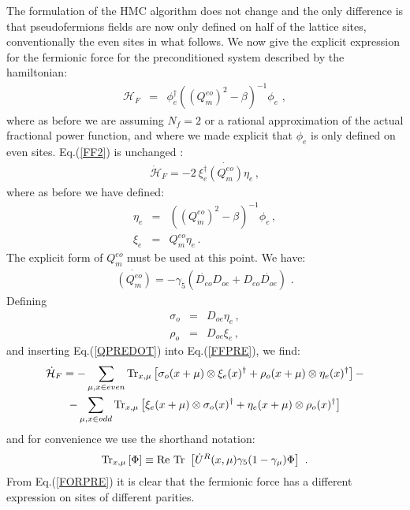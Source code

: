 \documentclass{article}[12pt]
\begin{document}
The formulation of the HMC algorithm does not change and the only difference is that pseudofermions fields
are now only defined on half of the lattice sites, conventionally the even sites in what follows.
We now give the explicit expression for the fermionic force for the preconditioned system described by
the hamiltonian:
\begin{eqnarray}
\mathcal{H}_F &=& \phi_e^\dagger ( (Q^{eo}_m)^2 - \beta )^{-1} \phi_e \,\, ,
\end{eqnarray}
where as before we are assuming $N_f=2$ or a rational approximation
of the actual fractional power function, and where we made explicit that $\phi_e$ is
only defined on even sites.
Eq.(\ref{FF2}) is unchanged :
\begin{eqnarray}
\dot{\mathcal{H}}_F = - 2 \ \xi_e^\dagger \dot{(Q^{eo}_m)} \eta_e \, ,\label{FFPRE}
\end{eqnarray}
where as before we have defined:
\begin{eqnarray}
\eta_e &=& ((Q^{eo}_m)^2 - \beta)^{-1} \phi_e \, , \\
\xi_e &=& Q^{eo}_m \eta_e \, .
\end{eqnarray}
The explicit form of $Q_m^{eo}$ must be used at this point. We have:
\begin{eqnarray}
\dot{(Q^{eo}_m)} = -\gamma_5 (\dot{D_{eo}} D_{oe} + D_{eo}\dot{D_{oe}} )\,\, .\label{QPREDOT}
\end{eqnarray}
Defining
\begin{eqnarray}
\sigma_o &=& D_{oe} \eta_e \, , \\
\rho_o &=& D_{oe} \xi_e \, ,
\end{eqnarray}
and inserting Eq.(\ref{QPREDOT}) into Eq.(\ref{FFPRE}), we find:
\begin{multline}
\dot{\mathcal{H}}_F =  - \sum_{\mu,x\in even} {\rm Tr}_{x,\mu}	\left[ \sigma_o(x+\mu)\otimes\xi_e(x)^\dagger + \rho_o(x+\mu)\otimes\eta_e(x)^\dagger \right] - \\
- \sum_{\mu,x\in odd} {\rm Tr}_{x,\mu}	\left[ \xi_e(x+\mu)\otimes\sigma_o(x)^\dagger + \eta_e(x+\mu)\otimes\rho_o(x)^\dagger \right] \label{FORPRE}
\end{multline}
and for convenience we use the shorthand notation:
\begin{equation}
{\rm Tr}_{x,\mu} \left[ \Phi \right] \equiv \mathrm{Re\ Tr\ } \left[ \dot U^R(x,\mu) \gamma_5 (1-\gamma_\mu) \Phi \right]\,\, .
\end{equation}
From Eq.(\ref{FORPRE}) it is clear that the fermionic force has a different expression on sites of different parities.
\end{document}
